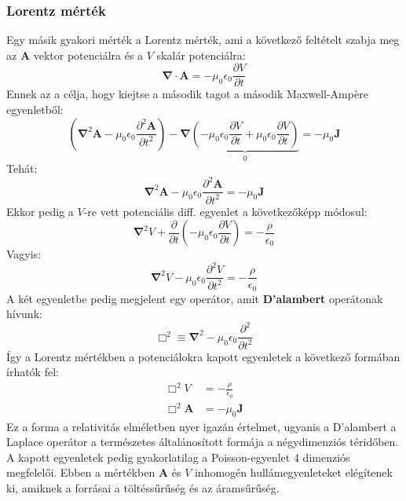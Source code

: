 \documentclass[../main.tex]{subfiles}
\begin{document}
\subsubsection{Lorentz mérték}
Egy másik gyakori mérték a Lorentz mérték, ami a következő feltételt szabja meg az $\mathbf{A}$ vektor potenciálra és a $V$ skalár potenciálra:
\begin{equation}
    \boxed{\boldsymbol{\nabla} \cdot \mathbf{A} = - \mu_0 \epsilon_0 \frac{\partial V}{\partial t}}
\end{equation}
Ennek az a célja, hogy kiejtse a második tagot a második Maxwell-Ampère egyenletből:
\begin{equation}
    \left(\boldsymbol{\nabla}^2 \mathbf{A} - \mu_0 \epsilon_0 \frac{\partial^2 \mathbf{A}}{\partial t^2}\right) - \boldsymbol{\nabla} \underbrace{\left(- \mu_0 \epsilon_0 \frac{\partial V}{\partial t} + \mu_0 \epsilon_0 \frac{\partial V}{\partial t}\right)}_{0} = - \mu_0 \mathbf{J}
\end{equation}
Tehát:
\begin{equation}
    \boldsymbol{\nabla}^2 \mathbf{A} - \mu_0 \epsilon_0 \frac{\partial^2 \mathbf{A}}{\partial t^2} = - \mu_0 \mathbf{J}
\end{equation}
Ekkor pedig a $V$-re vett potenciális diff. egyenlet a következőképp módosul:
\begin{equation}
    \boldsymbol{\nabla}^2 V + \frac{\partial }{\partial t} \left(- \mu_0 \epsilon_0 \frac{\partial V}{\partial t}\right) = - \frac{\rho}{\epsilon_0}
\end{equation}
Vagyis:
\begin{equation}
    \boldsymbol{\nabla}^2 V - \mu_0 \epsilon_0 \frac{\partial^2 V}{\partial t^2} = - \frac{\rho}{\epsilon_0}
\end{equation}
A két egyenletbe pedig megjelent egy operátor, amit \textbf{D'alambert} operátonak hívunk:
\begin{equation}
    \boxed{\Box^2 \equiv \boldsymbol{\nabla}^2 - \mu_0 \epsilon_0 \frac{\partial^2 }{\partial t^2}}
\end{equation}
Így a Lorentz mértékben a potenciálokra kapott egyenletek a következő formában írhatók fel:
\begin{equation}
    \boxed{\begin{aligned}
        \Box^2 V &= - \frac{\rho}{\epsilon_0} \\
        \Box^2 \mathbf{A} &= - \mu_0 \mathbf{J}
    \end{aligned}}
\end{equation}
Ez a forma a relativitás elméletben nyer igazán értelmet, ugyanis a D'alambert a Laplace operátor a természetes általánosított formája a négydimenziós téridőben. A kapott egyenletek pedig gyakorlatilag
a Poisson-egyenlet 4 dimenziós megfelelői. Ebben a mértékben $\mathbf{A}$ és $V$ inhomogén hullámegyenleteket elégítenek ki, amiknek a forrásai a töltéssűrűség és az áramsűrűség.
\end{document}
